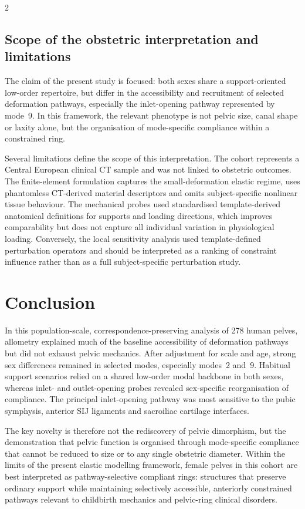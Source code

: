 \documentclass[openacc]{rsproca_new}
\begin{document}
\begin{multicols}{2}
\subsection{Scope of the obstetric interpretation and limitations}

The claim of the present study is focused: both sexes share a support-oriented low-order repertoire, but differ in the accessibility and recruitment of selected deformation pathways, especially the inlet-opening pathway represented by mode~9. In this framework, the relevant phenotype is not pelvic size, canal shape or laxity alone, but the organisation of mode-specific compliance within a constrained ring.

Several limitations define the scope of this interpretation. The cohort represents a Central European clinical CT sample and was not linked to obstetric outcomes. The finite-element formulation captures the small-deformation elastic regime, uses phantomless CT-derived material descriptors and omits subject-specific nonlinear tissue behaviour. The mechanical probes used standardised template-derived anatomical definitions for supports and loading directions, which improves comparability but does not capture all individual variation in physiological loading. Conversely, the local sensitivity analysis used template-defined perturbation operators and should be interpreted as a ranking of constraint influence rather than as a full subject-specific perturbation study.

\section{Conclusion}

In this population-scale, correspondence-preserving analysis of 278 human pelves, allometry explained much of the baseline accessibility of deformation pathways but did not exhaust pelvic mechanics. After adjustment for scale and age, strong sex differences remained in selected modes, especially modes~2 and~9. Habitual support scenarios relied on a shared low-order modal backbone in both sexes, whereas inlet- and outlet-opening probes revealed sex-specific reorganisation of compliance. The principal inlet-opening pathway was most sensitive to the pubic symphysis, anterior SIJ ligaments and sacroiliac cartilage interfaces.

The key novelty is therefore not the rediscovery of pelvic dimorphism, but the demonstration that pelvic function is organised through mode-specific compliance that cannot be reduced to size or to any single obstetric diameter. Within the limits of the present elastic modelling framework, female pelves in this cohort are best interpreted as pathway-selective compliant rings: structures that preserve ordinary support while maintaining selectively accessible, anteriorly constrained pathways relevant to childbirth mechanics and pelvic-ring clinical disorders.


\end{multicols}
\end{document}
